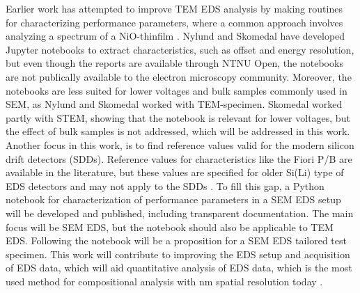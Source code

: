 

Earlier work has attempted to improve TEM EDS analysis by making routines for characterizing performance parameters, where a common approach involves analyzing a spectrum of a NiO-thinfilm \cite{egerton_nio_characterization_1994,ted_pella_nio_tem_2019}.
Nylund \cite{nylund_evaluation_2017} and Skomedal \cite{skomedal_improving_2022} have developed Jupyter notebooks to extract characteristics, such as offset and energy resolution, but even though the reports are available through NTNU Open, the notebooks are not publically available to the electron microscopy community.
Moreover, the notebooks are less suited for lower voltages and bulk samples commonly used in SEM, as Nylund and Skomedal worked with TEM-specimen.
Skomedal worked partly with STEM, showing that the notebook is relevant for lower voltages, but the effect of bulk samples is not addressed, which will be addressed in this work.
Another focus in this work, is to find reference values valid for the modern silicon drift detectors (SDDs).
Reference values for characteristics like the Fiori P/B \cite{fiori_peak_background_1982} are available in the literature, but these values are specified for older Si(Li) type of EDS detectors and may not apply to the SDDs \cite{sdd_lechner_2001}.
To fill this gap, a Python notebook for characterization of performance parameters in a SEM EDS setup will be developed and published, including transparent documentation.
The main focus will be SEM EDS, but the notebook should also be applicable to TEM EDS.
Following the notebook will be a proposition for a SEM EDS tailored test specimen.
This work will contribute to improving the EDS setup and acquisition of EDS data, which will aid quantitative analysis of EDS data, which is the most used method for compositional analysis with nm spatial resolution today \cite{goldstein_scanning_2018}.




